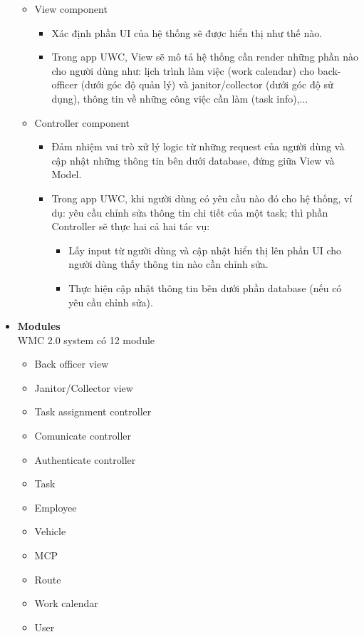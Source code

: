 \documentclass[a4paper]{article}
\begin{document}
\begin{itemize}
\begin{itemize}
        \item View component
        \begin{itemize}
            \item Xác định phần UI của hệ thống sẽ được hiển thị như thế nào. 
            \item Trong app UWC, View sẽ mô tả hệ thống cần render những phần nào cho người dùng như: lịch trình làm việc (work calendar) cho back-officer (dưới góc độ quản lý) và janitor/collector (dưới góc độ sử dụng), thông tin về những công việc cần làm (task info),...
        \end{itemize}
        
        \item Controller component
        \begin{itemize}
            \item Đảm nhiệm vai trò xử lý logic từ những request của người dùng và cập nhật những thông tin bên dưới database, đứng giữa View và Model.
            \item Trong app UWC, khi người dùng có yêu cầu nào đó cho hệ thống, ví dụ: yêu cầu chỉnh sửa thông tin chi tiết của một task; thì phần Controller sẽ thực hai cả hai tác vụ:
            \begin{itemize}
                \item Lấy input từ người dùng và cập nhật hiển thị lên phần UI cho người dùng thấy thông tin nào cần chỉnh sửa.
                \item Thực hiện cập nhật thông tin bên dưới phần database (nếu có yêu cầu chỉnh sửa).
            \end{itemize}
        \end{itemize}
        
    \end{itemize}
    
    
       \item \textbf{Modules} \\
   WMC 2.0 system có 12 module
       \begin{itemize}
        \item Back officer view
        \item Janitor/Collector view
        \item Task assignment controller
        \item Comunicate controller
        \item Authenticate controller
        \item Task
        \item Employee
        \item Vehicle
        \item MCP
        \item Route
        \item Work calendar
        \item User


\end{itemize}
\end{itemize}
\end{document}
